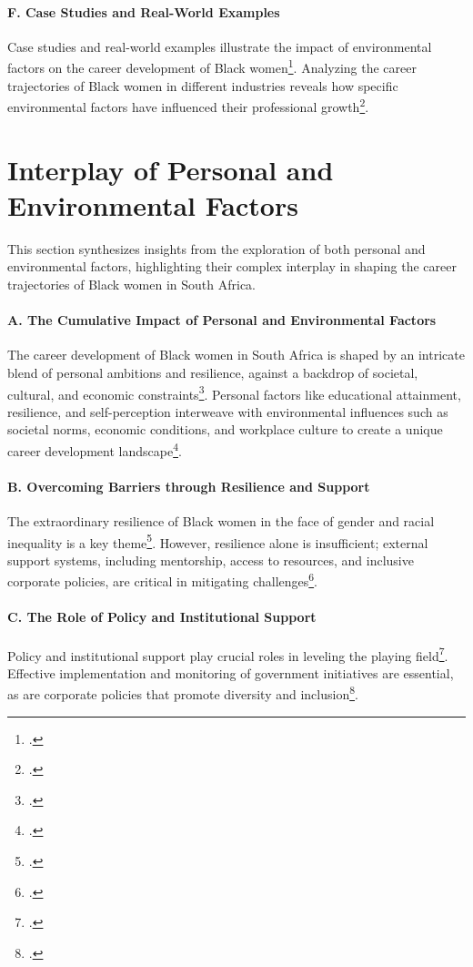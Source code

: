 \documentclass{article}
\begin{document}
\paragraph{F. Case Studies and Real-World Examples}
Case studies and real-world examples illustrate the impact of environmental factors on the career development of Black women\footcite{francis2022black}. Analyzing the career trajectories of Black women in different industries reveals how specific environmental factors have influenced their professional growth\footcite{matotoka2021mainstreaming}.


\section{Interplay of Personal and Environmental Factors}

This section synthesizes insights from the exploration of both personal and environmental factors, highlighting their complex interplay in shaping the career trajectories of Black women in South Africa.

\paragraph{A. The Cumulative Impact of Personal and Environmental Factors}
The career development of Black women in South Africa is shaped by an intricate blend of personal ambitions and resilience, against a backdrop of societal, cultural, and economic constraints\footcite{jaga2018doing}. Personal factors like educational attainment, resilience, and self-perception interweave with environmental influences such as societal norms, economic conditions, and workplace culture to create a unique career development landscape\footcite{monnapula-mapesela2017developing}.

\paragraph{B. Overcoming Barriers through Resilience and Support}
The extraordinary resilience of Black women in the face of gender and racial inequality is a key theme\footcite{cohen2020material}. However, resilience alone is insufficient; external support systems, including mentorship, access to resources, and inclusive corporate policies, are critical in mitigating challenges\footcite{chinyamurindi2016narrative}.

\paragraph{C. The Role of Policy and Institutional Support}
Policy and institutional support play crucial roles in leveling the playing field\footcite{lumby2011women}. Effective implementation and monitoring of government initiatives are essential, as are corporate policies that promote diversity and inclusion\footcite{rabe2012exploring}.
\end{document}
